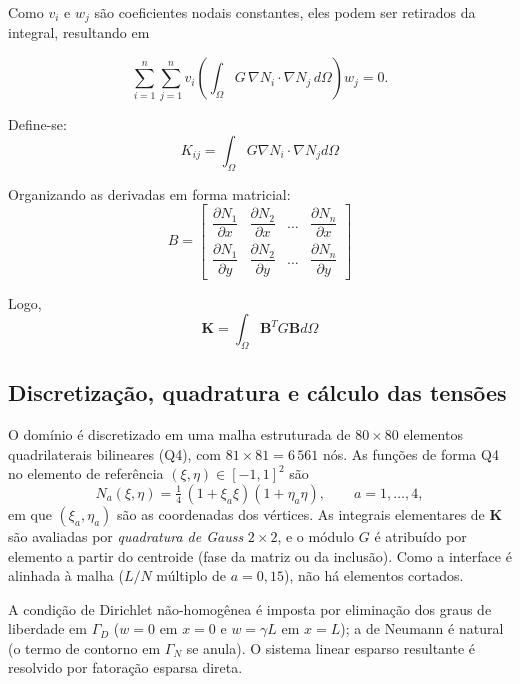\documentclass[brazil]{TCAM} %
\begin{document}
Como \(v_i\) e \(w_j\) são coeficientes nodais constantes, eles podem ser retirados da integral, resultando em

\begin{equation*}
\sum_{i=1}^{n}
\sum_{j=1}^{n}
v_i
\left(
\int_{\Omega}
G\,\nabla N_i\cdot\nabla N_j
\, d\Omega
\right)
w_j
=0.
\end{equation*}

Define-se:
\begin{equation*}
    K_{ij} = \int_{\Omega} G \nabla N_{i} \cdot \nabla N_j d \Omega
\end{equation*}

Organizando as derivadas em forma matricial:
\[
B=
\begin{bmatrix}
\dfrac{\partial N_1}{\partial x} &
\dfrac{\partial N_2}{\partial x} &
\dots &
\dfrac{\partial N_n}{\partial x}
\\[3mm]
\dfrac{\partial N_1}{\partial y} &
\dfrac{\partial N_2}{\partial y} &
\dots &
\dfrac{\partial N_n}{\partial y}
\end{bmatrix}
\]

Logo,
$$\mathbf{K}=\int_{\Omega}\mathbf{B}^TG\mathbf{B} d\Omega$$

\subsection{Discretização, quadratura e cálculo das tensões}

O domínio é discretizado em uma malha estruturada de $80\times80$ elementos
quadrilaterais bilineares (Q4), com $81\times81 = 6\,561$ nós. As funções de forma
Q4 no elemento de referência $(\xi,\eta)\in[-1,1]^2$ são
\begin{equation*}
    N_a(\xi,\eta) = \tfrac{1}{4}\,(1+\xi_a\xi)(1+\eta_a\eta), \qquad a=1,\dots,4,
\end{equation*}
em que $(\xi_a,\eta_a)$ são as coordenadas dos vértices. As integrais elementares de
$\mathbf{K}$ são avaliadas por \emph{quadratura de Gauss} $2\times2$, e o módulo $G$
é atribuído por elemento a partir do centroide (fase da matriz ou da inclusão). Como
a interface é alinhada à malha ($L/N$ múltiplo de $a=0{,}15$), não há elementos
cortados.

A condição de Dirichlet não-homogênea é imposta por eliminação dos graus de
liberdade em $\Gamma_D$ ($w=0$ em $x=0$ e $w=\gamma L$ em $x=L$); a de Neumann é
natural (o termo de contorno em $\Gamma_N$ se anula). O sistema linear esparso
resultante é resolvido por fatoração esparsa direta.
\end{document}
